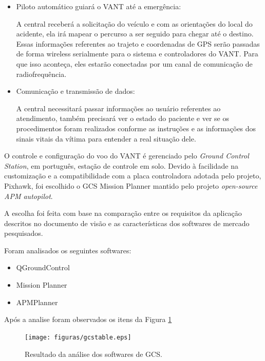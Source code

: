 \begin{itemize}
 \item Piloto automático guiará o VANT até a emergência: 

  A central receberá a solicitação do veículo e com as orientações do local do acidente, ela irá mapear o percurso a ser seguido para chegar até o destino.  Essas informações referentes ao trajeto e coordenadas de GPS serão passadas de forma wireless serialmente para o sistema e controladores do VANT. Para que isso aconteça, eles estarão conectadas por um canal de comunicação de radiofrequência. 

  \item Comunicação e transmissão de dados:

   A central necessitará passar informações ao usuário referentes ao atendimento, também precisará ver o estado do paciente e ver se os procedimentos foram realizados conforme as instruções e as informações dos sinais vitais da vítima para entender a real situação dele. 

\end{itemize}

O controle e configura\c{c}\~ao do voo do VANT \'e gerenciado pelo \textit{Ground Control Station}, em português, 
esta\c{c}\~ao de controle em solo. Devido à facilidade na customização e a compatibilidade com a placa controladora adotada pelo projeto, Pixhawk, foi escolhido o GCS Mission Planner mantido pelo projeto \textit{open-source  APM autopilot}.\cite{gcs}

A escolha foi feita com base na comparação entre os requisitos da aplicação descritos no documento de visão e as características dos softwares de mercado pesquisados.

Foram analisados os seguintes softwares: 

\begin{itemize}
  \item QGroundControl
  \item Mission Planner
  \item APMPlanner
\end{itemize}

Após a analise foram observados os itens da Figura \ref{fig:gcstable}

\begin{figure}[h!]
    \centering
      \texttt{[image: figuras/gcstable.eps]}
    \caption{Resultado da análise dos softwares de GCS.}
    \label{fig:gcstable}
\end{figure}

